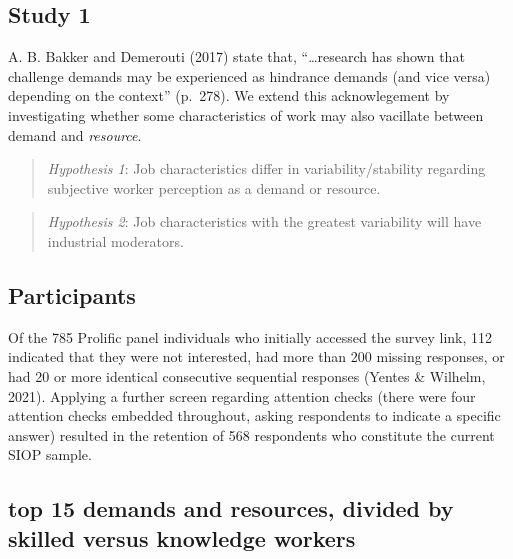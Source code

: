 \documentclass[
  english,
  man]{apa6}
\begin{document}
\hypertarget{study-1}{%
\subsection{Study 1}\label{study-1}}

A. B. Bakker and Demerouti (2017) state that, ``\ldots research has shown that challenge demands may be experienced as hindrance demands (and vice versa) depending on the context'' (p.~278). We extend this acknowlegement by investigating whether some characteristics of work may also vacillate between demand and \emph{resource}.

\begin{quote}
\emph{Hypothesis 1}: Job characteristics differ in variability/stability regarding subjective worker perception as a demand or resource.
\end{quote}

\begin{quote}
\emph{Hypothesis 2}: Job characteristics with the greatest variability will have industrial moderators.
\end{quote}

\hypertarget{participants}{%
\subsection{Participants}\label{participants}}

Of the 785 Prolific panel individuals who initially accessed the survey link, 112 indicated that they were not interested, had more than 200 missing responses, or had 20 or more identical consecutive sequential responses (Yentes \& Wilhelm, 2021). Applying a further screen regarding attention checks (there were four attention checks embedded throughout, asking respondents to indicate a specific answer) resulted in the retention of 568 respondents who constitute the current SIOP sample.

\hypertarget{top-15-demands-and-resources-divided-by-skilled-versus-knowledge-workers}{%
\subsection{top 15 demands and resources, divided by skilled versus knowledge workers}\label{top-15-demands-and-resources-divided-by-skilled-versus-knowledge-workers}}
\end{document}
